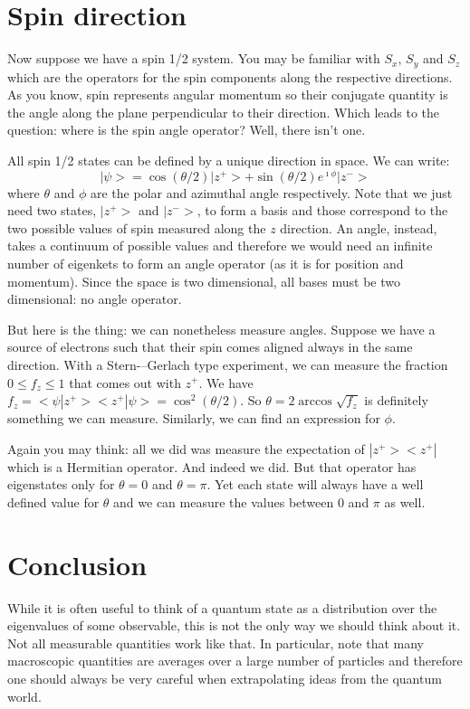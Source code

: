 \documentclass[aps,pra,10pt,floatfix,nofootinbib]{revtex4-1}
\theoremstyle{definition}
\begin{document}
\section{Spin direction}

Now suppose we have a spin 1/2 system. You may be familiar with $S_x$, $S_y$ and $S_z$ which are the operators for the spin components along the respective directions. As you know, spin represents angular momentum so their conjugate quantity is the angle along the plane perpendicular to their direction. Which leads to the question: where is the spin angle operator? Well, there isn't one.

All spin 1/2 states can be defined by a unique direction in space. We can write:
\begin{equation}
|\psi>=\cos(\theta/2)|z^+> + \sin(\theta/2)e^{\imath \phi}|z^->
\end{equation}
where $\theta$ and $\phi$ are the polar and azimuthal angle respectively. Note that we just need two states, $|z^+>$ and $|z^->$, to form a basis and those correspond to the two possible values of spin measured along the $z$ direction. An angle, instead, takes a continuum of possible values and therefore we would need an infinite number of eigenkets to form an angle operator (as it is for position and momentum). Since the space is two dimensional, all bases must be two dimensional: no angle operator.

But here is the thing: we can nonetheless measure angles. Suppose we have a source of electrons such that their spin comes aligned always in the same direction. With a Stern-–Gerlach type experiment, we can measure the fraction $0\leq f_z \leq 1$ that comes out with $z^+$. We have $f_z = <\psi|z^+><z^+|\psi> = \cos^2(\theta/2)$. So $\theta = 2 \arccos \sqrt{f_z}$ is definitely something we can measure. Similarly, we can find an expression for $\phi$.

Again you may think: all we did was measure the expectation of $|z^+><z^+|$ which is a Hermitian operator. And indeed we did. But that operator has eigenstates only for $\theta=0$ and $\theta=\pi$. Yet each state will always have a well defined value for $\theta$ and we can measure the values between $0$ and $\pi$ as well.

\section{Conclusion}

While it is often useful to think of a quantum state as a distribution over the eigenvalues of some observable, this is not the only way we should think about it. Not all measurable quantities work like that. In particular, note that many macroscopic quantities are averages over a large number of particles and therefore one should always be very careful when extrapolating ideas from the quantum world.
\end{document}
